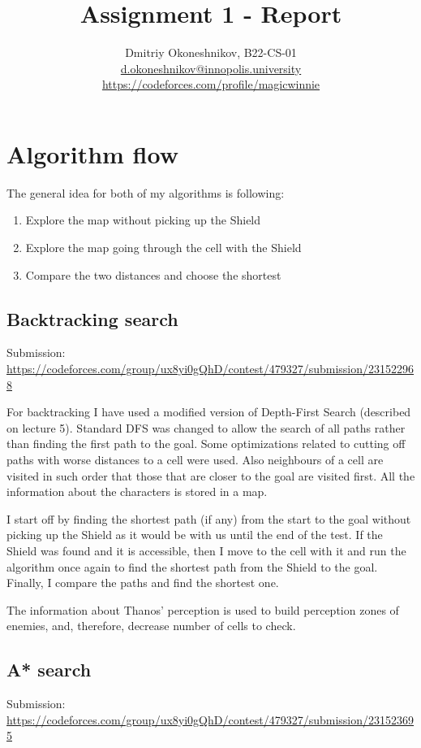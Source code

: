 \documentclass{article}
\title{Assignment 1 - Report}
\author{Dmitriy Okoneshnikov, B22-CS-01 \\ \href{mailto:d.okoneshnikov@innopolis.university}{d.okoneshnikov@innopolis.university} \\ \url{https://codeforces.com/profile/magicwinnie}}
\begin{document}
\maketitle

\tableofcontents
\newpage

\section{Algorithm flow}
The general idea for both of my algorithms is following:
\begin{enumerate}
    \item Explore the map without picking up the Shield
    \item Explore the map going through the cell with the Shield
    \item Compare the two distances and choose the shortest
\end{enumerate}
\subsection{Backtracking search}
Submission: \url{https://codeforces.com/group/ux8yi0gQhD/contest/479327/submission/231522968}

For backtracking I have used a modified version of Depth-First Search (described on lecture 5).
Standard DFS was changed to allow the search of all paths rather than finding the first path to the goal.
Some optimizations related to cutting off paths with worse distances to a cell were used.
Also neighbours of a cell are visited in such order that those that are closer to the goal are visited first.
All the information about the characters is stored in a map.

I start off by finding the shortest path (if any) from the start to the goal without picking up the Shield as it would be with us until the end of the test.
If the Shield was found and it is accessible, then I move to the cell with it and run the algorithm once again to find the shortest path from the Shield to the goal. 
Finally, I compare the paths and find the shortest one.

The information about Thanos' perception is used to build perception zones of enemies, and, therefore, decrease number of cells to check.
\subsection{A* search}
Submission: \url{https://codeforces.com/group/ux8yi0gQhD/contest/479327/submission/231523695}
\end{document}
